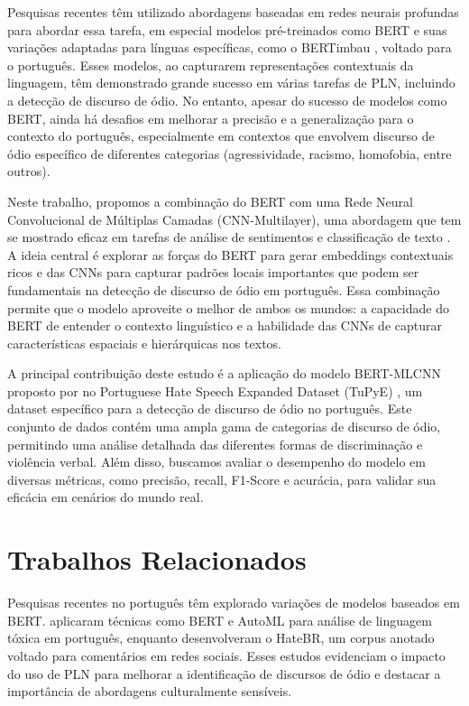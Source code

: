 \documentclass[sigconf,nonacm]{acmart}
\begin{document}
Pesquisas recentes têm utilizado abordagens baseadas em redes neurais profundas para abordar essa tarefa, 
em especial modelos pré-treinados como BERT \cite{devlin2019bertpretrainingdeepbidirectional} e suas variações 
adaptadas para línguas específicas, como o BERTimbau \cite{souza2020bertimbau}, voltado para o português. 
Esses modelos, ao capturarem representações contextuais da linguagem, têm demonstrado grande sucesso em várias tarefas de PLN, 
incluindo a detecção de discurso de ódio. No entanto, apesar do sucesso de modelos como BERT, 
ainda há desafios em melhorar a precisão e a generalização para o contexto do português, 
especialmente em contextos que envolvem discurso de ódio específico de diferentes categorias (agressividade, racismo, homofobia, entre outros).

Neste trabalho, propomos a combinação do BERT com uma Rede Neural Convolucional de Múltiplas Camadas (CNN-Multilayer), 
uma abordagem que tem se mostrado eficaz em tarefas de análise de sentimentos e classificação de texto \cite{oliveira2023tupye}. 
A ideia central é explorar as forças do BERT para gerar embeddings contextuais ricos e das CNNs para capturar padrões 
locais importantes que podem ser fundamentais na detecção de discurso de ódio em português. 
Essa combinação permite que o modelo aproveite o melhor de ambos os mundos: a capacidade do BERT de entender o contexto 
linguístico e a habilidade das CNNs de capturar características espaciais e hierárquicas nos textos.

A principal contribuição deste estudo é a aplicação do modelo BERT-MLCNN proposto por \citeauthor{ATANDOH2023101578} no 
Portuguese Hate Speech Expanded Dataset (TuPyE) \cite{oliveira2023tupye}, um dataset específico para a detecção de discurso de ódio no português. 
Este conjunto de dados contém uma ampla gama de categorias de discurso de ódio, permitindo uma análise detalhada das diferentes formas de 
discriminação e violência verbal. Além disso, buscamos avaliar o desempenho do modelo em diversas métricas, como precisão, recall, 
F1-Score e acurácia, para validar sua eficácia em cenários do mundo real.

\section{Trabalhos Relacionados}

Pesquisas recentes no português têm explorado variações de modelos baseados em BERT. 
\citeauthor{leite2020toxiclanguagedetectionsocial} aplicaram técnicas como BERT e AutoML para análise de linguagem tóxica em português, 
enquanto \citeauthor{vargas-etal-2022-hatebr} desenvolveram o HateBR, um corpus anotado voltado para comentários em redes sociais. 
Esses estudos evidenciam o impacto do uso de PLN para melhorar a identificação de discursos de ódio e destacar a importância de abordagens culturalmente sensíveis.
\end{document}

